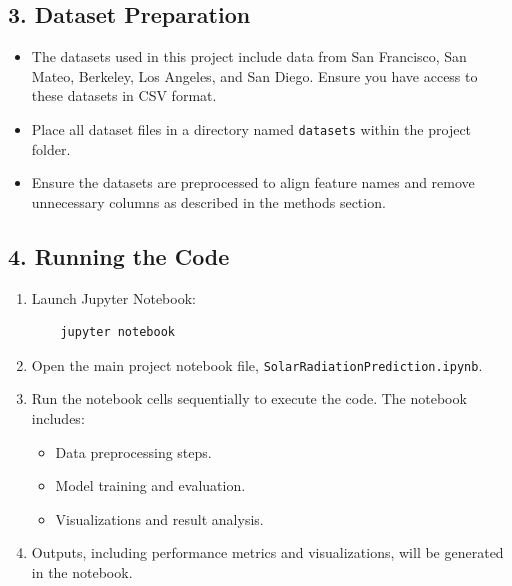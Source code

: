 \documentclass[10pt,twocolumn]{article}
\begin{document}
\begin{itemize}
\subsection*{3. Dataset Preparation}
\begin{itemize}
    \item The datasets used in this project include data from San Francisco, San Mateo, Berkeley, Los Angeles, and San Diego. Ensure you have access to these datasets in CSV format.
    \item Place all dataset files in a directory named \texttt{datasets} within the project folder.
    \item Ensure the datasets are preprocessed to align feature names and remove unnecessary columns as described in the methods section.
\end{itemize}

\subsection*{4. Running the Code}
\begin{enumerate}
    \item Launch Jupyter Notebook:
    \begin{verbatim}
    jupyter notebook
    \end{verbatim}
    \item Open the main project notebook file, \texttt{SolarRadiationPrediction.ipynb}.
    \item Run the notebook cells sequentially to execute the code. The notebook includes:
    \begin{itemize}
        \item Data preprocessing steps.
        \item Model training and evaluation.
        \item Visualizations and result analysis.
    \end{itemize}
    \item Outputs, including performance metrics and visualizations, will be generated in the notebook.
\end{enumerate}


\end{itemize}
\end{document}
